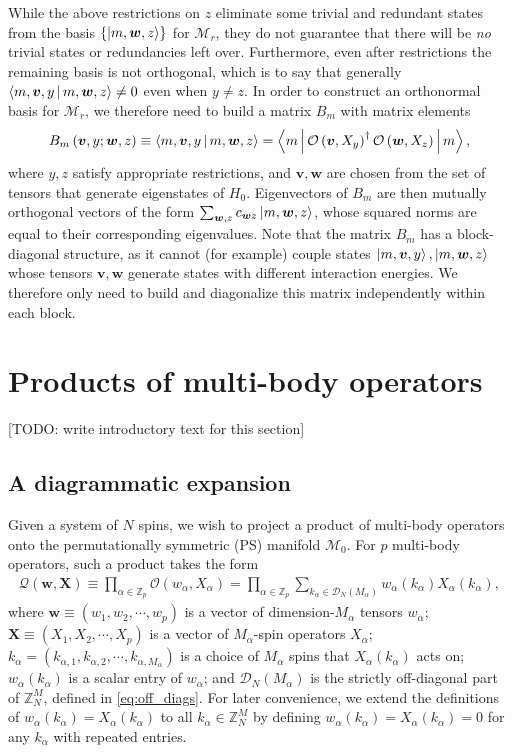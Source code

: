 \documentclass[nofootinbib,notitlepage,11pt]{revtex4-2}
\newcommand{\p}[1]{\left(#1\right)} %
\renewcommand{\set}[1]{\left\{#1\right\}} %
\newcommand{\bk}{\Braket} %
\newcommand{\m}{\bm} %
\newcommand{\1}{\mathds{1}}
\newcommand{\D}{\mathcal{D}}
\newcommand{\M}{\mathcal{M}}
\renewcommand{\O}{\mathcal{O}}
\newcommand{\Q}{\mathcal{Q}}
\newcommand{\ZZ}{\mathbb{Z}}
\newcommand{\red}[1]{{\color{red} #1}}
\begin{document}
While the above restrictions on $z$ eliminate some trivial and
redundant states from the basis $\set{\ket{m,\m w,z}}$ for $\M_r$,
they do not guarantee that there will be {\it no} trivial states or
redundancies left over.  Furthermore, even after restrictions the
remaining basis is not orthogonal, which is to say that generally
$\bk{m,\m v,y|m,\m w,z}\ne0$ even when $y\ne z$.  In order to
construct an orthonormal basis for $\M_r$, we therefore need to build
a matrix $B_m$ with matrix elements
\begin{align}
  B_m\p{\m v,y;\m w,z} \equiv \bk{m,\m v,y|m,\m w,z}
  = \bk{m| \O\p{\m v,X_y}^\dag \O\p{\m w,X_z} |m},
\end{align}
where $y,z$ satisfy appropriate restrictions, and $\m v,\m w$ are
chosen from the set of tensors that generate eigenstates of $H_0$.
Eigenvectors of $B_m$ are then mutually orthogonal vectors of the form
$\sum_{\m w,z}c_{\m w z}\ket{m,\m w,z}$, whose squared norms are equal
to their corresponding eigenvalues.  Note that the matrix $B_m$ has a
block-diagonal structure, as it cannot (for example) couple states
$\ket{m,\m v,y},\ket{m,\m w,z}$ whose tensors $\m v,\m w$ generate
states with different interaction energies.  We therefore only need to
build and diagonalize this matrix independently within each block.

\section{Products of multi-body operators}
\label{sec:operator_product}

\red{[TODO: write introductory text for this section]}

\subsection{A diagrammatic expansion}

Given a system of $N$ spins, we wish to project a product of
multi-body operators onto the permutationally symmetric (PS) manifold
$\M_0$.  For $p$ multi-body operators, such a product takes the form
\begin{align}
  \Q\p{\m w,\m X}
  \equiv \prod_{\alpha\in\ZZ_p} \O\p{w_\alpha,X_\alpha}
  = \prod_{\alpha\in\ZZ_p} \sum_{k_\alpha\in\D_N\p{M_\alpha}}
  w_\alpha\p{k_\alpha} X_\alpha\p{k_\alpha},
  \label{eq:sym_prod_start}
\end{align}
where $\m w\equiv\p{w_1,w_2,\cdots,w_p}$ is a vector of
dimension-$M_\alpha$ tensors $w_\alpha$;
$\m X\equiv\p{X_1,X_2,\cdots,X_p}$ is a vector of $M_\alpha$-spin
operators $X_\alpha$;
$k_\alpha=\p{k_{\alpha,1},k_{\alpha,2},\cdots,k_{\alpha,M_\alpha}}$ is
a choice of $M_\alpha$ spins that $X_\alpha\p{k_\alpha}$ acts on;
$w_\alpha\p{k_\alpha}$ is a scalar entry of $w_\alpha$; and
$\D_N\p{M_\alpha}$ is the strictly off-diagonal part of $\ZZ_N^M$,
defined in \eqref{eq:off_diags}.  For later convenience, we extend the
definitions of $w_\alpha\p{k_\alpha}=X_\alpha\p{k_\alpha}$ to all
$k_\alpha\in\ZZ_N^M$ by defining
$w_\alpha\p{k_\alpha}=X_\alpha\p{k_\alpha}=0$ for any $k_\alpha$ with
repeated entries.
\end{document}
